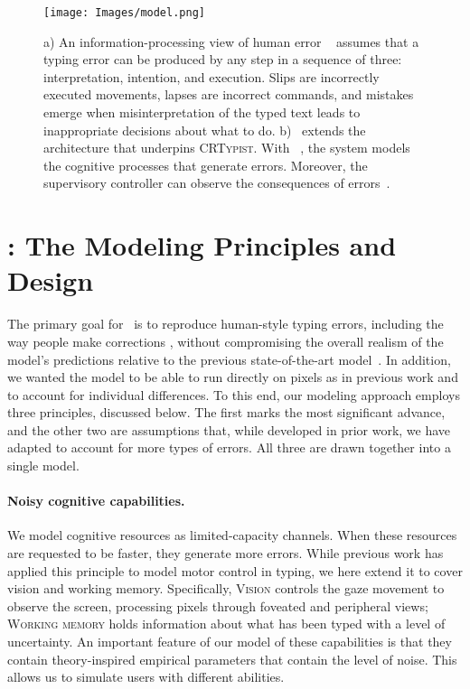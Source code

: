 \begin{figure}[!t]
\centering
  \texttt{[image: Images/model.png]}
  \caption{
  a) An information-processing view of human error ~\cite{wickens2021engineering} assumes that a typing error can be produced by any step in a sequence of three: interpretation, intention, and execution. 
  Slips are incorrectly executed movements,
  lapses are incorrect commands, and mistakes emerge when misinterpretation of the typed text leads to inappropriate decisions about what to do.
  b) ~\name extends the architecture that underpins \textsc{CRTypist}. With ~\name, the system models the cognitive processes that generate errors. Moreover, the supervisory controller can observe the consequences of errors~\cite{shi2024crtypist}.}
  \label{fig:model}
\end{figure}

\section{\name: The Modeling Principles and Design}

The primary goal for ~\name is to reproduce human-style typing errors, including the way people make corrections \cite{pinet2022correction}, without compromising the overall realism of the model's predictions relative to the previous state-of-the-art model~\cite{shi2024crtypist}. In addition, we wanted the model to be able to run directly on pixels as in previous work 
and to account for individual differences. To this end, our modeling approach employs three principles, discussed below.
The first marks the most significant advance, and the other two are assumptions that, while developed in prior work,
we have adapted to account for more types of errors. All three are drawn together into a single model.

\paragraph{Noisy cognitive capabilities.} 
We model cognitive resources as limited-capacity channels. 
When these resources are requested to be faster, they generate more errors.
While previous work has applied this principle to model motor control in typing, we here extend it to cover vision and working memory.
Specifically, \textsc{Vision} controls the gaze movement to observe the screen, processing pixels through foveated and peripheral views; \textsc{Working memory} holds information about what has been typed with a level of uncertainty.
An important feature of our model of these capabilities is that they contain theory-inspired empirical parameters that contain the level of noise. 
This allows us to simulate users with different abilities.

